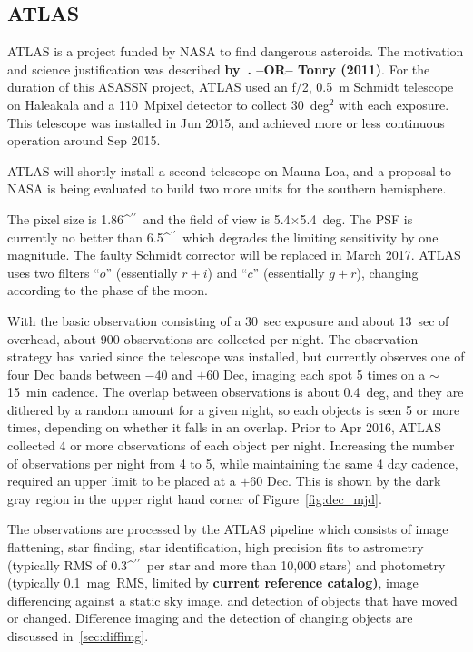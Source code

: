 \documentclass[aps,prb,twocolumn,superscriptaddress]{revtex4-1}
\def\arcsec{\ifmmode^{\prime\prime}\else$^{\prime\prime}$\fi}
\begin{document}
\subsection{ATLAS}
%
ATLAS is a project funded by NASA to find dangerous asteroids.  The
motivation and science justification was described 
{\bf by~\cite{ATLAS_data}. --OR--  Tonry (2011)}.
For the duration of this ASASSN project, ATLAS used an f/2, 0.5~m
Schmidt telescope on Haleakala and a 110~Mpixel detector to collect
30~deg$^2$ with each exposure.  This telescope was installed in Jun
2015, and achieved more or less continuous operation around Sep 2015.

ATLAS will shortly install a second telescope on Mauna Loa, and a
proposal to NASA is being evaluated to build two more units for the
southern hemisphere.

The pixel size is 1.86\arcsec\ and the field of view is
5.4$\times$5.4~deg.  The PSF is currently no better than 6.5\arcsec\
which degrades the limiting sensitivity by one magnitude.  The faulty
Schmidt corrector will be replaced in March 2017.  ATLAS uses two
filters ``$o$'' (essentially $r+i$) and ``$c$'' (essentially $g+r$),
changing according to the phase of the moon.

With the basic observation consisting of a 30~sec exposure and about 
13~sec of overhead, about 900 observations are collected per night.  
The observation strategy has varied since the telescope was
installed, but currently observes one of four Dec bands between $-40$
and $+60$ Dec, imaging each spot 5 times on a $\sim$15~min cadence.
The overlap between observations is about 0.4~deg, and they are
dithered by a random amount for a given night, so each objects is seen
5 or more times, depending on whether it falls in an overlap.  
Prior to Apr 2016, ATLAS collected 4 or more observations of each object 
per night. Increasing the number of observations per night from 4 to 5, 
while maintaining the same 4 day cadence, required an upper limit to 
be placed at a $+60$ Dec. This is shown by the dark gray region in 
the upper right hand corner of Figure~\ref{fig:dec_mjd}.

The observations are processed by the ATLAS pipeline which consists of
image flattening, star finding, star identification, high precision
fits to astrometry (typically RMS of 0.3\arcsec\ per star and more
than 10,000 stars) and photometry (typically 0.1~mag~RMS, limited by
{\bf current reference catalog)}, image differencing against a static sky
image, and detection of objects that have moved or changed.  
Difference imaging and the detection of changing objects 
are discussed in~\cref{sec:diffimg}.
\end{document}
